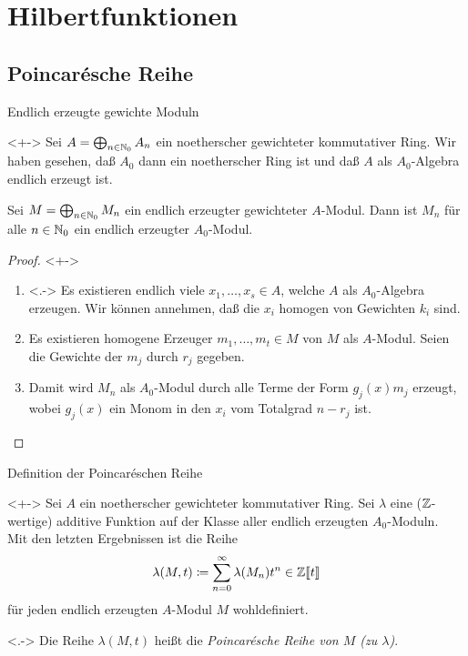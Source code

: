 \section{Hilbertfunktionen}

\subsection{Poincarésche Reihe}

\begin{frame}{Endlich erzeugte gewichte Moduln}
	\begin{visibleenv}<+->
		Sei \(A = \bigoplus_{n \in \mathbb N_0} A_n\) ein noetherscher gewichteter kommutativer Ring. Wir haben
		gesehen, daß \(A_0\) dann ein noetherscher Ring ist und daß \(A\) als
		\(A_0\)-Algebra endlich erzeugt ist.
	\end{visibleenv}
	\begin{proposition}
		Sei
		\(M = \bigoplus_{n \in \mathbb N_0} M_n\) ein endlich erzeugter gewichteter \(A\)-Modul. Dann ist
		\(M_n\) für alle \(n \in \mathbb N_0\) ein endlich erzeugter \(A_0\)-Modul.
	\end{proposition}
	\begin{proof}<+->
		\begin{enumerate}[<+->]
		\item<.->
			Es existieren endlich
			viele \(x_1, \dotsc, x_s \in A\), welche \(A\) als
			\(A_0\)-Algebra erzeugen. Wir können annehmen, daß die \(x_i\)
			homogen von Gewichten \(k_i\) sind.
		\item
			Es existieren homogene Erzeuger \(m_1, \dotsc, m_t \in M\) von \(M\) als
			\(A\)-Modul. Seien die Gewichte der \(m_j\) durch \(r_j\) gegeben.
		\item
			Damit wird  \(M_n\) als \(A_0\)-Modul durch alle Terme der Form
			\(g_j(x) m_j\) erzeugt, wobei \(g_j(x)\) ein Monom in den \(x_i\) vom
			Totalgrad \(n - r_j\) ist.
			\qedhere
		\end{enumerate}
	\end{proof}
\end{frame}

\begin{frame}{Definition der Poincaréschen Reihe}
	\begin{visibleenv}<+->
		Sei \(A\) ein noetherscher gewichteter kommutativer Ring. Sei
		\(\lambda\) eine (\(\mathbb Z\)-wertige) additive Funktion auf der Klasse
		aller endlich erzeugten \(A_0\)-Moduln.
		\\
		Mit den letzten Ergebnissen ist die Reihe
		\[
			\lambda(M, t) \coloneqq \sum\limits_{n = 0}^\infty \lambda(M_n) t^n
			\in \mathbb Z\llbracket t\rrbracket
		\]
		für jeden endlich erzeugten \(A\)-Modul \(M\)
		wohldefiniert.
	\end{visibleenv}
	\begin{definition}<.->
		Die Reihe \(\lambda(M, t)\) heißt die \emph{Poincarésche Reihe
		von \(M\) (zu \(\lambda\))}.
	\end{definition}
\end{frame}

